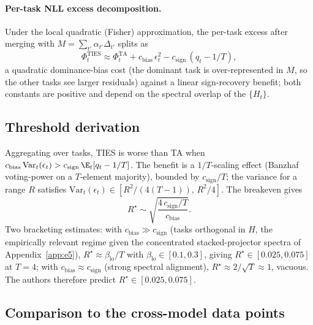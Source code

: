 \paragraph{Per-task NLL excess decomposition.} Under the local
quadratic (Fisher) approximation, the per-task excess after merging
with $M = \sum_{t'} \alpha_{t'}\Delta_{t'}$ splits as
\begin{equation}
  \Phi_t^{\mathrm{TIES}}
  \approx
  \Phi_t^{\mathrm{TA}}
  + c_{\mathrm{bias}}\,\epsilon_t^2
  - c_{\mathrm{sign}}\,(q_t - 1/T),
  \label{eq:excess-decomp}
\end{equation}
a quadratic dominance-bias cost (the dominant task is over-represented
in $M$, so the other tasks see larger residuals) against a linear
sign-recovery benefit; both constants are positive and depend on the
spectral overlap of the $\{H_t\}$.

\subsection{Threshold derivation}

Aggregating over tasks, TIES is worse than TA when
$c_{\mathrm{bias}}\,\mathrm{Var}_t(\epsilon_t) >
c_{\mathrm{sign}}\,\E_t[q_t - 1/T]$. The benefit is a $1/T$-scaling
effect (Banzhaf voting-power on a $T$-element majority), bounded by
$c_{\mathrm{sign}}/T$; the variance for a range $R$ satisfies
$\mathrm{Var}_t(\epsilon_t) \in [R^2/(4(T-1)),\, R^2/4]$. The
breakeven gives
\begin{equation}
  R^\star
  \sim
  \sqrt{\frac{4\, c_{\mathrm{sign}}/T}{c_{\mathrm{bias}}}}.
  \label{eq:threshold}
\end{equation}
Two bracketing estimates: with $c_{\mathrm{bias}} \gg
c_{\mathrm{sign}}$ (tasks orthogonal in $H$, the empirically relevant
regime given the concentrated stacked-projector spectra of
Appendix~\ref{app:e5}), $R^\star \approx \beta_{\mathrm{lo}}/T$ with
$\beta_{\mathrm{lo}} \in [0.1, 0.3]$, giving
$R^\star \in [0.025, 0.075]$ at $T = 4$; with $c_{\mathrm{bias}}
\approx c_{\mathrm{sign}}$ (strong spectral alignment),
$R^\star \approx 2/\sqrt{T} \approx 1$, vacuous. The authors therefore predict
$R^\star \in [0.025, 0.075]$.

\subsection{Comparison to the cross-model data points}
\label{app:td2-comparison}

